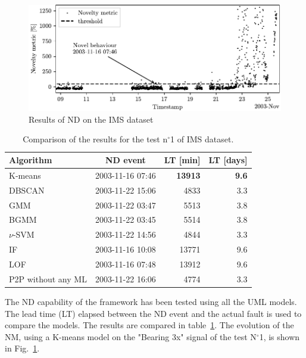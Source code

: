 \begin{figure}
    \includegraphics[width=\linewidth]{images/ND_IMS.pdf}
    \caption{Results of ND on the IMS dataset}
    \label{fig:ND_IMS}
\end{figure}
\begin{table}
    \centering
    \caption{Comparison of the results for the test n$^\circ$1 of IMS dataset.}
    \label{tab:ims01_comparision}
    \begin{tabular}{lcrr} 
    \toprule
    \textbf{Algorithm} & \textbf{ND event} & \textbf{LT }{[}min] & \textbf{LT }{[}days] \\ 
    \hline
    K-means & 2003-11-16 07:46 & \textbf{13913} & \textbf{9.6} \\
    DBSCAN & 2003-11-22 15:06 & 4833 & 3.3\\
    GMM & 2003-11-22 03:47 & 5513 & 3.8\\
    BGMM & 2003-11-22 03:45 & 5514 & 3.8\\
    $\nu$-SVM & 2003-11-22 14:56 & 4844 &3.3\\
    IF & 2003-11-16 10:08 & 13771 & 9.6\\
    LOF & 2003-11-16 07:48 & 13912 & 9.6\\
    {P2P} without any ML & 2003-11-22 16:06 & 4774 & 3.3\\
    \bottomrule
    \end{tabular}
\end{table}
The ND capability of the framework has been tested using all the UML models. The lead time (LT) elapsed between the ND event and the actual fault is used to compare the models. The results are compared in table~\ref{tab:ims01_comparision}. The evolution of the NM, using a K-means model on the "Bearing 3x" signal of the test N$^\circ$1, is shown in Fig.~\ref{fig:ND_IMS}.

